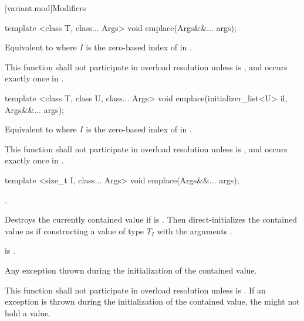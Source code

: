 [variant.mod]{Modifiers}

%
\begin{itemdecl}
template <class T, class... Args> void emplace(Args&&... args);
\end{itemdecl}

\begin{itemdescr}
\pnum
\effects
Equivalent to  where $I$
is the zero-based index of  in .

\pnum
\remarks
This function shall not participate in overload resolution unless
 is , and  occurs
exactly once in .
\end{itemdescr}

%
\begin{itemdecl}
template <class T, class U, class... Args> void emplace(initializer_list<U> il, Args&&... args);
\end{itemdecl}

\begin{itemdescr}
\pnum
\effects
Equivalent to  where
$I$ is the zero-based index of  in .

\pnum
\remarks
This function shall not participate in overload resolution unless
 is ,
and  occurs exactly once in .
\end{itemdescr}

%
\begin{itemdecl}
template <size_t I, class... Args> void emplace(Args&&... args);
\end{itemdecl}

\begin{itemdescr}
\pnum
\requires
{}.

\pnum
\effects
Destroys the currently contained value if 
is . Then direct-initializes the contained value as if
constructing a value of type $T_I$ with the arguments
.

\pnum
\postconditions
{} is .

\pnum
\throws
Any exception thrown during the initialization of the contained value.

\pnum
\remarks
This function shall not participate in overload resolution unless
 is .
If an exception is thrown during the initialization of the contained value,
the  might not hold a value.
\end{itemdescr}

